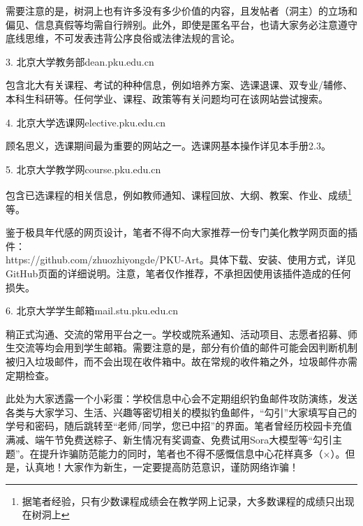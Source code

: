 \documentclass[11pt,oneside]{book}
\begin{document}
需要注意的是，树洞上也有许多没有多少价值的内容，且发帖者（洞主）的立场和偏见、信息真假等均需自行辨别。此外，即使是匿名平台，也请大家务必注意遵守底线思维，不可发表违背公序良俗或法律法规的言论。

\vspace{10pt}

3. 北京大学教务部\quad dean.pku.edu.cn

包含北大有关课程、考试的种种信息，例如培养方案、选课退课、双专业/辅修、本科生科研等。任何学业、课程、政策等有关问题均可在该网站尝试搜索。

\vspace{10pt}

4. 北京大学选课网\quad elective.pku.edu.cn

顾名思义，选课期间最为重要的网站之一。选课网基本操作详见本手册2.3。

\vspace{10pt}

5. 北京大学教学网\quad course.pku.edu.cn

包含已选课程的相关信息，例如教师通知、课程回放、大纲、教案、作业、成绩\footnote{据笔者经验，只有少数课程成绩会在教学网上记录，大多数课程的成绩只出现在树洞上}等。

鉴于极具年代感的网页设计，笔者不得不向大家推荐一份专门美化教学网页面的插件：\\https://github.com/zhuozhiyongde/PKU-Art。具体下载、安装、使用方式，详见GitHub页面的详细说明。注意，笔者仅作推荐，不承担因使用该插件造成的任何损失。

\vspace{10pt}

6. 北京大学学生邮箱\quad mail.stu.pku.edu.cn 

稍正式沟通、交流的常用平台之一。学校或院系通知、活动项目、志愿者招募、师生交流等均会用到学生邮箱。需要注意的是，部分有价值的邮件可能会因判断机制被归入垃圾邮件，而不会出现在收件箱中。故在常规的收件箱之外，垃圾邮件亦需定期检查。

\vspace{10pt}

此处为大家透露一个小彩蛋：学校信息中心会不定期组织钓鱼邮件攻防演练，发送各类与大家学习、生活、兴趣等密切相关的模拟钓鱼邮件，“勾引”大家填写自己的学号和密码，随后跳转至“老师/同学，您已中招”的界面。笔者曾经历校园卡充值满减、端午节免费送粽子、新生情况有奖调查、免费试用Sora大模型等“勾引主题”。在提升诈骗防范能力的同时，笔者也不得不感慨信息中心花样真多（$\times$）。但是，认真地！大家作为新生，一定要提高防范意识，谨防网络诈骗！

\vspace{10pt}
\end{document}
